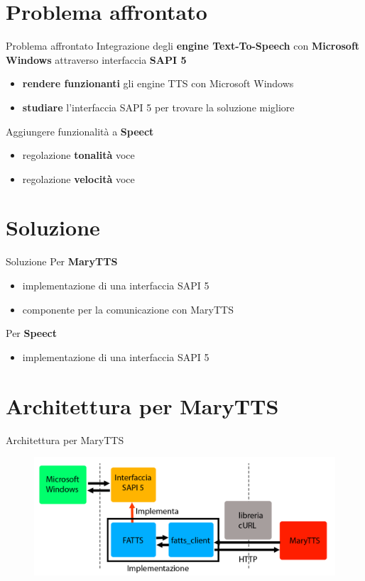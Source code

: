 \documentclass{beamer}
\begin{document}
	\section{Problema affrontato}

	\begin{frame}{Problema affrontato}
		Integrazione degli \textbf{engine Text-To-Speech} con \textbf{Microsoft Windows} attraverso interfaccia \textbf{SAPI 5}
		\begin{itemize}
		\item \textbf{rendere funzionanti} gli engine TTS con Microsoft Windows
		\item \textbf{studiare} l'interfaccia SAPI 5 per trovare la soluzione migliore
		\end{itemize}
		\vspace{10pt}
		Aggiungere funzionalità a \textbf{Speect}
		\begin{itemize}
			\item regolazione \textbf{tonalità} voce
			\item regolazione \textbf{velocità} voce
		\end{itemize}
	\end{frame}

	\section{Soluzione}
	
	\begin{frame}{Soluzione}
		Per \textbf{MaryTTS}
		\begin{itemize}
			\item implementazione di una interfaccia SAPI 5
			\item componente per la comunicazione con MaryTTS
		\end{itemize}
		Per \textbf{Speect}
		\begin{itemize}
			\item implementazione di una interfaccia SAPI 5
		\end{itemize}
	\end{frame}

	\section{Architettura per MaryTTS}
	
	\begin{frame}{Architettura per MaryTTS}
		\begin{figure}[H]
			\centering
			\includegraphics[width=\textwidth]{images/FATTS-sapi5.png}
		\end{figure}
	\end{frame}
\end{document}
